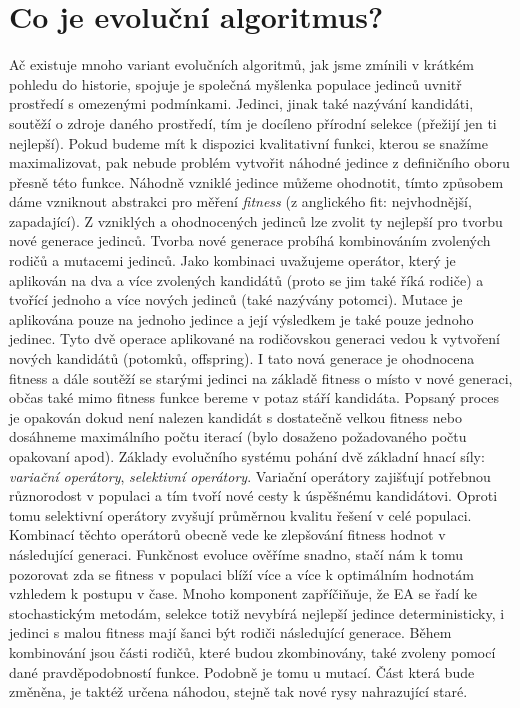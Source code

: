 \section{Co je evoluční algoritmus?}
Ač existuje mnoho variant evolučních algoritmů, jak jsme zmínili v krátkém pohledu do historie, spojuje je společná myšlenka populace jedinců uvnitř prostředí s omezenými podmínkami. Jedinci, jinak také nazývání kandidáti, soutěží o zdroje daného prostředí, tím je docíleno přírodní selekce (přežijí jen ti nejlepší). Pokud budeme mít k dispozici kvalitativní funkci, kterou se snažíme maximalizovat, pak nebude problém vytvořit náhodné jedince z definičního oboru přesně této funkce. Náhodně vzniklé jedince můžeme ohodnotit, tímto způsobem dáme vzniknout abstrakci pro měření \textit{fitness} (z anglického fit: nejvhodnější, zapadající). Z vzniklých a ohodnocených jedinců lze zvolit ty nejlepší pro tvorbu nové generace jedinců. Tvorba nové generace probíhá kombinováním zvolených rodičů a mutacemi jedinců. Jako kombinaci uvažujeme operátor, který je aplikován na dva a více zvolených kandidátů (proto se jim také říká rodiče) a tvořící jednoho a více nových jedinců (také nazývány potomci). Mutace je aplikována pouze na jednoho jedince a její výsledkem je také pouze jednoho jedinec. Tyto dvě operace aplikované na rodičovskou generaci vedou k vytvoření nových kandidátů (potomků, offspring). I tato nová generace je ohodnocena fitness a dále soutěží se starými jedinci na základě fitness o místo v nové generaci, občas také mimo fitness funkce bereme v potaz stáří kandidáta. Popsaný proces je opakován dokud není nalezen kandidát s dostatečně velkou fitness nebo dosáhneme maximálního počtu iterací (bylo dosaženo požadovaného počtu opakovaní apod). Základy evolučního systému pohání dvě základní hnací síly: \textit{variační operátory}, \textit{selektivní operátory}. Variační operátory zajišťují potřebnou různorodost v populaci a tím tvoří nové cesty k úspěšnému kandidátovi. Oproti tomu selektivní operátory zvyšují průměrnou kvalitu řešení v celé populaci. Kombinací těchto operátorů obecně vede ke zlepšování fitness hodnot v následující generaci. Funkčnost evoluce ověříme snadno, stačí nám k tomu pozorovat zda se fitness v populaci blíží více a více k optimálním hodnotám vzhledem k postupu v čase. Mnoho komponent zapříčiňuje, že EA se řadí ke stochastickým metodám, selekce totiž nevybírá nejlepší jedince deterministicky, i jedinci s malou fitness mají šanci být rodiči následující generace. Během kombinování jsou části rodičů, které budou zkombinovány, také zvoleny pomocí dané pravděpodobností funkce. Podobně je tomu u mutací. Část která bude změněna, je taktéž určena náhodou, stejně tak nové rysy nahrazující staré.  
